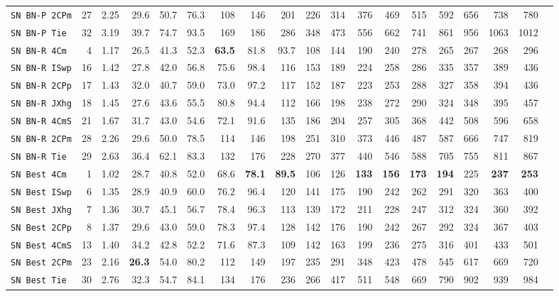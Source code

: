 \begin{tabular}{l | r @{~~} r | r@{~~}r@{~~}r@{~~}r@{~~}r@{~~}r@{~~}r@{~~}r@{~~}r@{~~}r@{~~}r@{~~}r@{~~}r@{~~}r@{~~}r@{~~}r|}
\verb+SN BN-P 2CPm+ & 27 & 2.25 & 29.6&50.7&76.3&108&146&201&226&314&376&469&515&592&656&738&780\\
\verb+SN BN-P Tie + & 32 & 3.19 & 39.7&74.7&93.5&169&186&286&348&473&556&662&741&861&956&1063&1012\smallskip \\
\verb+SN BN-R 4Cm + & 4 & 1.17 & 26.5&41.3&52.3&\textbf{63.5}&81.8&93.7&108&144&190&240&278&265&267&268&296\\
\verb+SN BN-R ISwp+ & 16 & 1.42 & 27.8&42.0&56.8&75.6&98.4&116&153&189&224&258&286&335&357&389&436\\
\verb+SN BN-R 2CPp+ & 17 & 1.43 & 32.0&40.7&59.0&73.0&97.2&117&152&187&223&253&288&327&358&394&436\\
\verb+SN BN-R JXhg+ & 18 & 1.45 & 27.6&43.6&55.5&80.8&94.4&112&166&198&238&272&290&324&348&395&457\\
\verb+SN BN-R 4CmS+ & 21 & 1.67 & 31.7&43.0&54.6&72.1&91.6&135&186&204&257&305&368&442&508&596&658\\
\verb+SN BN-R 2CPm+ & 28 & 2.26 & 29.6&50.0&78.5&114&146&198&251&310&373&446&487&587&666&747&819\\
\verb+SN BN-R Tie + & 29 & 2.63 & 36.4&62.1&83.3&132&176&228&270&377&440&546&588&705&755&811&867\smallskip \\
\verb+SN Best 4Cm + & 1 & 1.02 & 28.7&40.8&52.0&68.6&\textbf{78.1}&\textbf{89.5}&106&126&\textbf{133}&\textbf{156}&\textbf{173}&\textbf{194}&225&\textbf{237}&\textbf{253}\\
\verb+SN Best ISwp+ & 6 & 1.35 & 28.9&40.9&60.0&76.2&96.4&120&141&175&190&242&262&291&320&363&400\\
\verb+SN Best JXhg+ & 7 & 1.36 & 30.7&45.1&56.7&78.4&96.3&113&139&172&211&228&247&312&324&360&392\\
\verb+SN Best 2CPp+ & 8 & 1.37 & 29.6&43.0&59.0&78.3&97.4&128&142&176&190&242&267&292&324&367&403\\
\verb+SN Best 4CmS+ & 13 & 1.40 & 34.2&42.8&52.2&71.6&87.3&109&142&163&199&236&275&316&401&433&501\\
\verb+SN Best 2CPm+ & 23 & 2.16 & \textbf{26.3}&54.0&80.2&112&149&197&235&291&348&423&478&545&617&669&720\\
\verb+SN Best Tie + & 30 & 2.76 & 32.3&54.7&84.1&134&176&236&266&417&511&548&669&790&902&939&984\\
\end{tabular}
